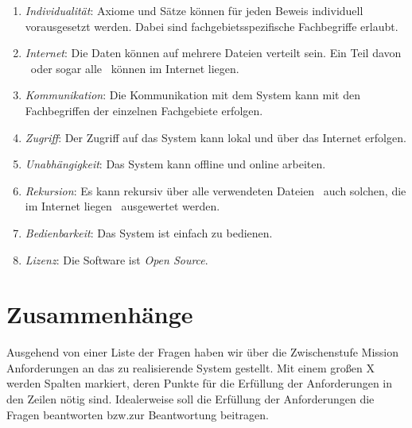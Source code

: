 \documentclass[english,ngerman,parskip=half,headsepline,footsepline]{scrreprt}
\begin{document}
\begin{enumerate}
		\item \label{Ziel:Individualität} \emph{Individualität}: Axiome und Sätze können für jeden Beweis individuell vorausgesetzt werden. Dabei sind fachgebietsspezifische Fachbegriffe erlaubt.
		
		\item \label{Ziel:Internet} \emph{Internet}: Die Daten können auf mehrere Dateien verteilt sein. Ein Teil davon \textendash\ oder sogar alle \textendash\ können im Internet liegen.
		
		\item \label{Ziel:Kommunikation} \emph{Kommunikation}: Die Kommunikation mit dem System kann mit den Fachbegriffen der einzelnen Fachgebiete erfolgen.
		
		\item \label{Ziel:Zugriff} \emph{Zugriff}: Der Zugriff auf das System kann lokal und über das Internet erfolgen.
		
		\item \label{Ziel:Unabhängigkeit} \emph{Unabhängigkeit}: Das System kann offline und online arbeiten.
		
		\item \label{Ziel:Rekursion} \emph{Rekursion}: Es kann rekursiv über alle verwendeten Dateien \textendash\ auch solchen, die im Internet liegen \textendash\ ausgewertet werden.
		
		\item \label{Ziel:Bedienbarkeit} \emph{Bedienbarkeit}: Das System ist einfach zu bedienen.
		
		\item \label{Ziel:Lizenz} \emph{Lizenz}: Die Software ist \emph{Open Source}.
		
	\end{enumerate}
	
	\section{Zusammenhänge}
    \label{sec:Zusammenhänge}

	Ausgehend von einer Liste der Fragen haben wir über die Zwischenstufe Mission Anforderungen an das zu realisierende System gestellt. Mit einem großen X werden Spalten markiert, deren Punkte für die Erfüllung der Anforderungen in den Zeilen nötig sind. Idealerweise soll die Erfüllung der Anforderungen die Fragen beantworten bzw.\@ zur Beantwortung beitragen.
	
\end{document}
